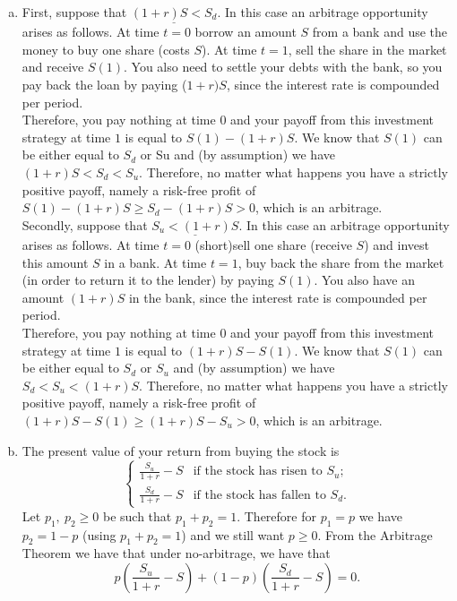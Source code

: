 \documentclass[11pt,a4paper]{article}
\begin{document}
    \begin{enumerate}[(a)]
        \item First, suppose that $\underline{(1 + r)S < S_d}$. In this case an arbitrage opportunity arises as follows. At time $t = 0$ borrow an amount $S$ from a bank and use the money to buy one share (costs $S$). At time $t = 1$, sell the share in the market and receive $S(1)$. You also need to settle your debts with the bank, so you pay back the loan by paying ($1 + r)S$, since the interest rate is compounded per period.\\
        Therefore, you pay nothing at time $0$ and your payoff from this investment strategy at time $1$ is equal to $S(1) − (1 + r)S$. We know that $S(1)$ can be either equal to $S_d$ or Su and (by assumption) we have $(1 + r)S < S_d < S_u$. Therefore, no matter what happens you have a strictly positive payoff, namely a risk-free profit of $S(1) − (1 + r)S \geq S_d − (1 + r)S > 0$, which is an arbitrage.\\
        Secondly, suppose that $\underline{S_u < (1 + r)S}$. In this case an arbitrage opportunity arises as follows. At time $t = 0$ (short)sell one share (receive $S$) and invest this amount $S$ in a bank. At time $t = 1$, buy back the share from the market (in order to return it to the lender) by paying $S(1)$. You also have an amount $(1 + r)S$ in the bank, since the interest rate is compounded per period.\\
        Therefore, you pay nothing at time $0$ and your payoff from this investment strategy at time $1$ is equal to $(1 + r)S − S(1)$. We know that $S(1)$ can be either equal to $S_d$ or $S_u$ and (by assumption) we have $S_d < S_u < (1 + r)S$. Therefore, no matter what happens you have a strictly positive payoff, namely a risk-free profit of $(1 + r)S − S(1) \geq (1 + r)S − S_u > 0$, which is an arbitrage.
        \item The present value of your return from buying the stock is
        $$
        \begin{cases}
            \frac{S_u}{1+r}-S & \text{if the stock has risen to $S_u$};\\
            \frac{S_d}{1+r}-S & \text{if the stock has fallen to $S_d$}.
        \end{cases}
        $$
        Let $p_1,\ p_2 \geq 0$ be such that $p_1 + p_2 = 1$. Therefore for $p_1 = p$ we have $p_2 = 1 − p$ (using $p_1 + p_2 = 1$) and we still want $p \geq 0$. From the Arbitrage Theorem we have that under no-arbitrage, we have that
        $$
        p\left(\frac{S_u}{1+r}-S\right)+(1-p)\left(\frac{S_d}{1+r}-S\right) = 0.
$$
\end{enumerate}
\end{document}
